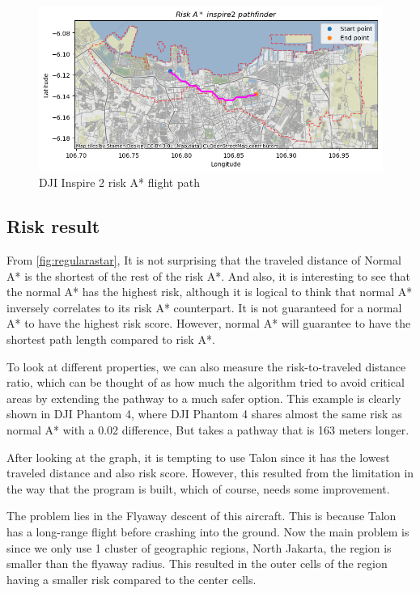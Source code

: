 \documentclass[12pt]{report}
\begin{document}
        \begin{figure}[H]
            \centering
            \includegraphics[width=\textwidth]{Plot/inspire/inspire_route.png}
            \caption{DJI Inspire 2 risk A* flight path}
        \end{figure}

        \subsection{Risk result}
        From \ref{fig:regularastar}, It is not surprising that the traveled distance of Normal A* is the shortest of the
        rest of the risk A*. And also, it is interesting to see that the normal A* has the highest risk, although it is
        logical to think that normal A* inversely correlates to its risk A* counterpart. It is not guaranteed for a
        normal A* to have the highest risk score. However, normal A* will guarantee to have the shortest path length
        compared to risk A*.
            
        To look at different properties, we can also measure the risk-to-traveled distance ratio, which can be thought
        of as how much the algorithm tried to avoid critical areas by extending the pathway to a much safer option. This
        example is clearly shown in DJI Phantom 4, where DJI Phantom 4 shares almost the same risk as normal A* with a
        0.02 difference, But takes a pathway that is 163 meters longer.
            
        After looking at the graph, it is tempting to use Talon since it has the lowest traveled distance and also risk
        score. However, this resulted from the limitation in the way that the program is built, which of course, needs
        some improvement.
            
        The problem lies in the Flyaway descent of this aircraft. This is because Talon has a long-range flight before
        crashing into the ground. Now the main problem is since we only use 1 cluster of geographic regions, North
        Jakarta, the region is smaller than the flyaway radius. This resulted in the outer cells of the region having a
        smaller risk compared to the center cells.
            
\end{document}

